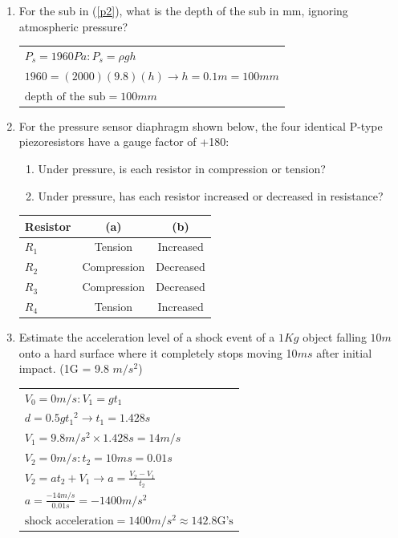 \documentclass{article}
\begin{document}
\begin{multicols}{2}
\begin{enumerate}
\item\label{p3}
For the sub in (\ref{p2}), what is the depth of the sub in mm, ignoring atmospheric
     pressure?

		\begin{tabular}{ l }
			$P_s = 1960 Pa \colon P_s = \rho g h$\\
			$1960 = (2000)(9.8)(h)\rightarrow h = 0.1m = 100mm$\\
			$\text{depth of the sub} = 100 mm$
		\end{tabular}
\item\label{p4}
For the pressure sensor diaphragm shown below, the four identical P-type
     piezoresistors have a gauge factor of +180:
     \begin{enumerate}
	\item Under pressure, is each resistor in compression or tension?

	\item Under pressure, has each resistor increased or decreased in resistance?
     \end{enumerate}

		\begin{tabular}{ l | c | c }
			Resistor & (a) & (b) \\ \hline
			$R_1$ & Tension & Increased\\
			$R_2$ & Compression & Decreased\\
			$R_3$ & Compression & Decreased\\
			$R_4$ & Tension & Increased\\
		\end{tabular}
  
\item\label{p5}
 Estimate the acceleration level of a shock event of a $1 Kg$ object falling $10m$ onto
     a hard surface where it completely stops moving 10$ms$ after initial impact. (1G =
     9.8 $m/s^2$)

		\begin{tabular}{ l }
			$V_0 = 0m/s \colon V_1 = g t_1$\\
			$d = 0.5 g {t_1}^2 \rightarrow t_1 = 1.428s$\\
			$V_1 = 9.8m/s^2 \times 1.428 s = 14m/s$\\
			$V_2 = 0m/s \colon t_2 = 10ms = 0.01s$\\
			$V_2 = a t_2 + V_1 \rightarrow a = \frac{V_2 - V_1}{t_2}$\\
			$a = \frac{-14m/s}{0.01s} = -1400m/s^2$\\
			$\text{shock acceleration} = 1400m/s^2 \approx 142.8\text{G's}$
		\end{tabular}

\end{enumerate}
\end{multicols}
\end{document}
